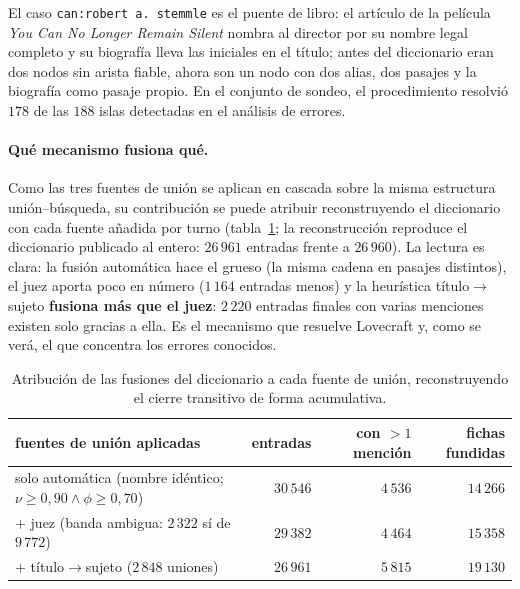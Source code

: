 \documentclass[11pt,a4paper]{article}
\begin{document}
El caso \texttt{can:robert a. stemmle} es el puente de libro: el artículo
de la película \emph{You Can No Longer Remain Silent} nombra al director
por su nombre legal completo y su biografía lleva las iniciales en el
título; antes del diccionario eran dos nodos sin arista fiable, ahora son
un nodo con dos alias, dos pasajes y la biografía como pasaje propio. En el
conjunto de sondeo, el procedimiento resolvió $178$ de las $188$
\guillemotleft{}islas\guillemotright{} detectadas en el análisis de errores.

\paragraph{Qué mecanismo fusiona qué.}
Como las tres fuentes de unión se aplican en cascada sobre la misma
estructura unión--búsqueda, su contribución se puede atribuir
reconstruyendo el diccionario con cada fuente añadida por turno
(tabla~\ref{tab:dicc-atribucion}; la reconstrucción reproduce el
diccionario publicado al entero: $26\,961$ entradas frente a $26\,960$).
La lectura es clara: la fusión automática hace el grueso (la misma cadena
en pasajes distintos), el juez aporta poco en número ($1\,164$ entradas
menos) y la heurística título$\to$sujeto \textbf{fusiona más que el
juez}: $2\,220$ entradas finales con varias menciones existen solo gracias
a ella. Es el mecanismo que resuelve Lovecraft y, como se verá, el que
concentra los errores conocidos.

\begin{table}[t]
\centering\footnotesize\setlength{\tabcolsep}{5pt}
\caption{Atribución de las fusiones del diccionario a cada fuente de unión,
reconstruyendo el cierre transitivo de forma acumulativa.}
\label{tab:dicc-atribucion}
\begin{tabular}{lrrr}
\toprule
fuentes de unión aplicadas & entradas & con $>1$ mención & fichas fundidas\\
\midrule
solo automática (nombre idéntico; $\nu\ge0{,}90 \wedge \phi\ge0{,}70$) & $30\,546$ & $4\,536$ & $14\,266$\\
$+$ juez (banda ambigua: $2\,322$ \guillemotleft{}sí\guillemotright{} de $9\,772$) & $29\,382$ & $4\,464$ & $15\,358$\\
$+$ título$\to$sujeto ($2\,848$ uniones) & $26\,961$ & $5\,815$ & $19\,130$\\
\bottomrule
\end{tabular}
\end{table}
\end{document}
